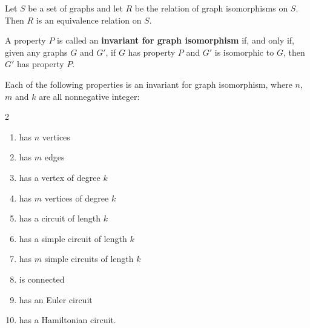 \documentclass[../mathNotesPreamble]{subfiles}
\begin{document}
  \begin{thmBox*}[Theorem 10.3.1]
    Let $S$ be a set of graphs and let $R$ be the relation of graph isomorphisms on $S$. Then $R$ is an equivalence relation on $S$.
  \end{thmBox*}
  \begin{defn*}
    A property $P$ is called an \textbf{invariant for graph isomorphism} if, and only if, given any graphs $G$ and $G'$, if $G$ has property $P$ and $G'$ is isomorphic to $G$, then $G'$ has property $P$.
  \end{defn*}

  \begin{thmBox*}[Theorem 10.3.2]
    Each of the following properties is an invariant for graph isomorphism, where $n$, $m$ and $k$ are all nonnegative integer:
    \begin{multicols}{2}
      \begin{enumerate}
        \item has $n$ vertices
        \item has $m$ edges
        \item has a vertex of degree $k$
        \item has $m$ vertices of degree $k$
        \item has a circuit of length $k$
        \item has a simple circuit of length $k$
        \item has $m$ simple circuits of length $k$
        \item is connected
        \item has an Euler circuit
        \item has a Hamiltonian circuit.
      \end{enumerate}
    \end{multicols}
  \end{thmBox*}
  \pagebreak
\end{document}
